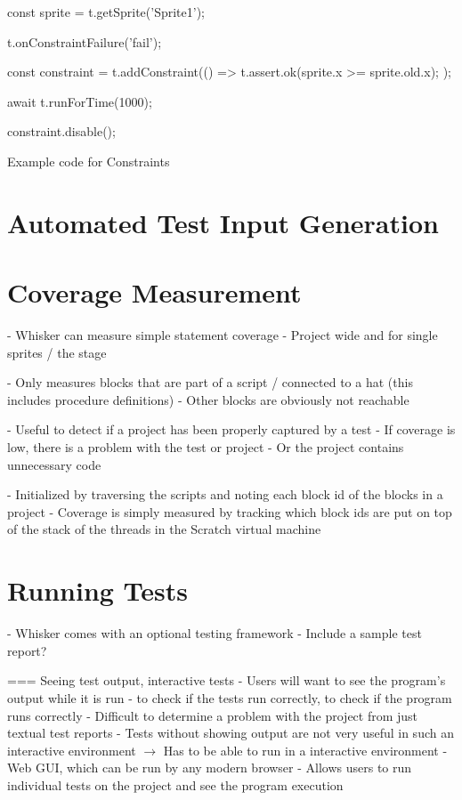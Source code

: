 \begin{listing}[ht]
    \centering
    \begin{javascriptcode}
        const sprite = t.getSprite('Sprite1');

        t.onConstraintFailure('fail');

        const constraint = t.addConstraint(() => {
            t.assert.ok(sprite.x >= sprite.old.x);
        });

        await t.runForTime(1000);

        constraint.disable();
    \end{javascriptcode}
    \vspace{-\bigskipamount}
    \caption{Example code for Constraints}
    \label{fig:example_code_for_constraints}
\end{listing}

\section{Automated Test Input Generation}

\section{Coverage Measurement}
- Whisker can measure simple statement coverage
- Project wide and for single sprites / the stage

- Only measures blocks that are part of a script / connected to a hat (this includes procedure definitions)
- Other blocks are obviously not reachable

- Useful to detect if a project has been properly captured by a test
    - If coverage is low, there is a problem with the test or project
    - Or the project contains unnecessary code

- Initialized by traversing the scripts and noting each block id of the blocks in a project
- Coverage is simply measured by tracking which block ids are put on top of the stack of the threads in the Scratch virtual machine

\section{Running Tests}
\label{sec:running_tests}
- Whisker comes with an optional testing framework
- Include a sample test report?

=== Seeing test output, interactive tests
- Users will want to see the program's output while it is run
    - to check if the tests run correctly, to check if the program runs correctly
    - Difficult to determine a problem with the project from just textual test reports
    - Tests without showing output are not very useful in such an interactive environment
$\rightarrow$ Has to be able to run in a interactive environment
    - Web GUI, which can be run by any modern browser
    - Allows users to run individual tests on the project and see the program execution

